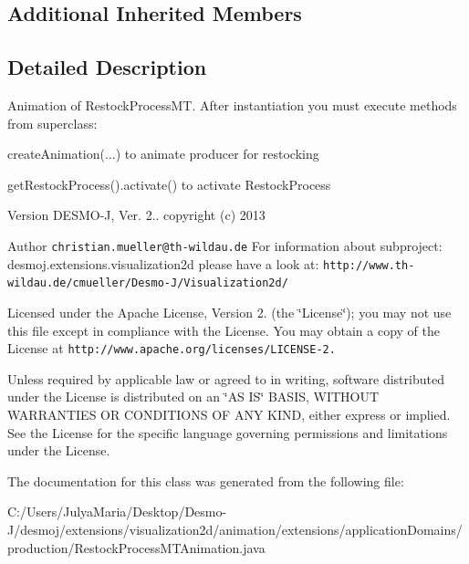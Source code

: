 \subsection*{Additional Inherited Members}


\subsection{Detailed Description}
Animation of Restock\-Process\-M\-T. After instantiation you must execute methods from superclass\-:\par
 create\-Animation(...) to animate producer for restocking\par
 get\-Restock\-Process().activate() to activate Restock\-Process

\begin{DoxyVersion}{Version}
D\-E\-S\-M\-O-\/\-J, Ver. 2.. copyright (c) 2013 
\end{DoxyVersion}
\begin{DoxyAuthor}{Author}
{\tt christian.\-mueller@th-\/wildau.\-de} For information about subproject\-: desmoj.\-extensions.\-visualization2d please have a look at\-: {\tt http\-://www.\-th-\/wildau.\-de/cmueller/\-Desmo-\/\-J/\-Visualization2d/}
\end{DoxyAuthor}
Licensed under the Apache License, Version 2. (the \char`\"{}\-License\char`\"{}); you may not use this file except in compliance with the License. You may obtain a copy of the License at {\tt http\-://www.\-apache.\-org/licenses/\-L\-I\-C\-E\-N\-S\-E-\/2.}

Unless required by applicable law or agreed to in writing, software distributed under the License is distributed on an \char`\"{}\-A\-S I\-S\char`\"{} B\-A\-S\-I\-S, W\-I\-T\-H\-O\-U\-T W\-A\-R\-R\-A\-N\-T\-I\-E\-S O\-R C\-O\-N\-D\-I\-T\-I\-O\-N\-S O\-F A\-N\-Y K\-I\-N\-D, either express or implied. See the License for the specific language governing permissions and limitations under the License. 

The documentation for this class was generated from the following file\-:\begin{DoxyCompactItemize}
\item 
C\-:/\-Users/\-Julya\-Maria/\-Desktop/\-Desmo-\/\-J/desmoj/extensions/visualization2d/animation/extensions/application\-Domains/production/Restock\-Process\-M\-T\-Animation.\-java\end{DoxyCompactItemize}
